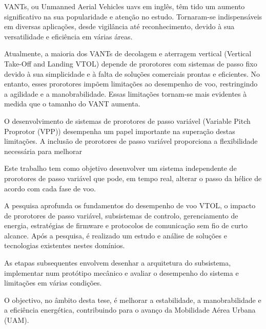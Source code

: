 \begin{abstractotherlanguage}

\glspl{VANT}, ou Unmanned Aerial Vehicles \glspl{uav} em inglês, têm tido um aumento significativo na sua popularidade e atenção no estudo.
Tornaram-se indispensáveis em diversas aplicações, desde vigilância até reconhecimento, devido à sua versatilidade e eficiência em várias áreas.

Atualmente, a maioria dos \glspl{VANT} de decolagem e aterragem vertical (Vertical Take-Oﬀ and Landing \gls{VTOL}) depende de prorotores com sistemas de passo fixo devido à sua simplicidade e à falta de soluções comerciais prontas e eficientes.
No entanto, esses prorotores impõem limitações ao desempenho de voo, restringindo a agilidade e a manobrabilidade.
Essas limitações tornam-se mais evidentes à medida que o tamanho do \gls{VANT} aumenta.

O desenvolvimento de sistemas de prorotores de passo variável (Variable Pitch Proprotor (VPP)) desempenha um papel importante na superação destas limitações.
A inclusão de prorotores de passo variável proporciona a flexibilidade necessária para melhorar

Este trabalho tem como objetivo desenvolver um sistema independente de prorotores de passo variável que pode, em tempo real, alterar o passo da hélice de acordo com cada fase de voo.

A pesquisa aprofunda os fundamentos do desempenho de voo \gls{VTOL}, o impacto de prorotores de passo variável, subsistemas de controlo, gerenciamento de energia, estratégias de firmware e protocolos de comunicação sem fio de curto alcance.
Após a pesquisa, é realizado um estudo e análise de soluções e tecnologias existentes nestes domínios.

As etapas subsequentes envolvem desenhar a arquitetura do subsistema, implementar num protótipo mecânico e avaliar o desempenho do sistema e limitações em várias condições.

O objectivo, no âmbito desta tese, é melhorar a estabilidade, a manobrabilidade e a eficiência energética, contribuindo para o avanço da Mobilidade Aérea Urbana (UAM).


\end{abstractotherlanguage}




